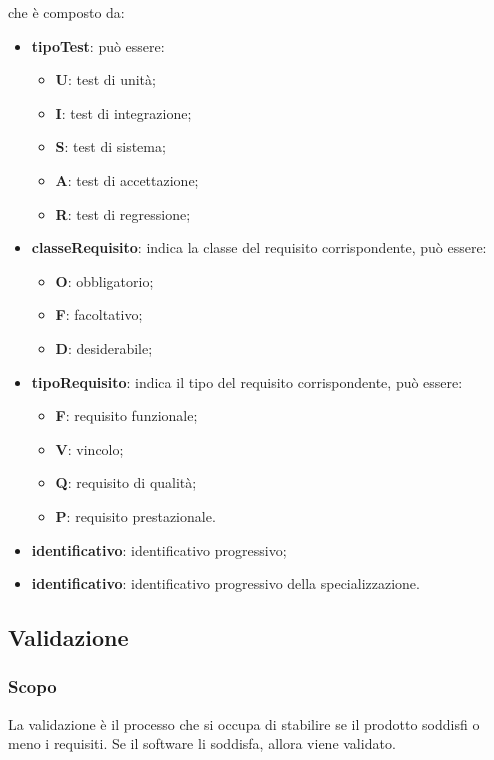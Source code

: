 	che è composto da:
	\begin{itemize}
	    \item \textbf{tipoTest}: può essere:
	    \begin{itemize}
	        \item \textbf{U}: test di unità;
	        \item \textbf{I}: test di integrazione;
	        \item \textbf{S}: test di sistema;
	        \item \textbf{A}: test di accettazione;
	        \item \textbf{R}: test di regressione;
	    \end{itemize}
	    \item \textbf{classeRequisito}: indica la classe del requisito corrispondente, può essere:
	        \begin{itemize}
	            \item \textbf{O}: obbligatorio;
	            \item \textbf{F}: facoltativo;
	            \item \textbf{D}: desiderabile;
	        \end{itemize}
	   \item \textbf{tipoRequisito}: indica il tipo del requisito corrispondente, può essere:
	        \begin{itemize}
	            \item \textbf{F}: requisito funzionale;
	            \item \textbf{V}: vincolo;
	            \item \textbf{Q}: requisito di qualità;
	            \item \textbf{P}: requisito prestazionale. 
	        \end{itemize}
	  \item \textbf{identificativo}: identificativo progressivo;
	  \item \textbf{identificativo}: identificativo progressivo della specializzazione.
	\end{itemize}
	\subsection{Validazione}

	\subsubsection{Scopo}
	La validazione è il processo che si occupa di stabilire se il prodotto soddisfi o meno i requisiti. Se il software li soddisfa, allora viene validato.
